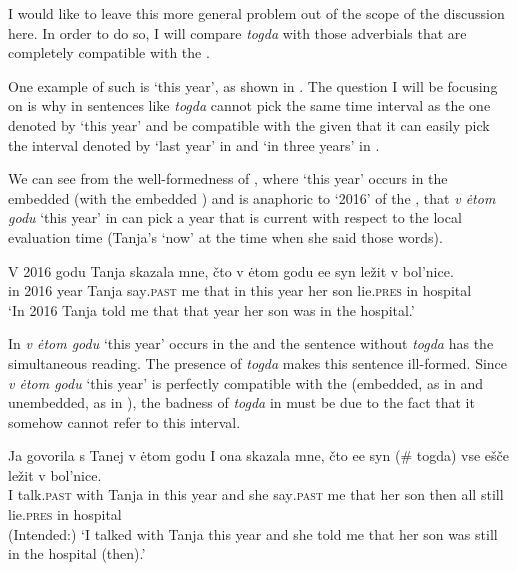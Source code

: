 \documentclass[output=paper,modfonts,newtxmath,hidelinks]{langscibook}
\begin{document}
\label{20:ex11}
\z

\noindent I would like to leave this more general problem out of the scope of the discussion here. In order to do so, I will compare \textit{togda} with those adverbials that are completely compatible with the .

One example of such  is ‘this year’, as shown in . The question I will be focusing on is why in sentences like  \textit{togda} cannot pick the same time interval as the one denoted by ‘this year’ and be compatible with the  given that it can easily pick the interval denoted by ‘last year’ in  and ‘in three years’ in .

We can see from the well-formedness of , where ‘this year’ occurs in the embedded  (with the embedded ) and is anaphoric to ‘2016’ of the , that \textit{v ėtom godu} ‘this year’ in  can pick a year that is current with respect to the local evaluation time (Tanja’s ‘now’ at the time when she said those words).

\ea \label{20:ex12}
\gll V 2016 godu Tanja skazala mne, čto v ėtom godu ee syn ležit v bol’nice.\\
     in 2016 year Tanja say\textsc{.past} me that in this year her son lie\textsc{.pres} in hospital\\
\glt `In 2016 Tanja told me that that year her son was in the hospital.'
\z

\noindent In  \textit{v ėtom godu} ‘this year’ occurs in the  and the sentence without \textit{togda} has the simultaneous reading. The presence of \textit{togda} makes this sentence ill-formed. Since \textit{v ėtom godu} ‘this year’ is perfectly compatible with the  (embedded, as in  and unembedded, as in ), the badness of \textit{togda} in  must be due to the fact that it somehow cannot refer to this interval.

\ea \label{20:ex13}
\gll Ja govorila s Tanej v ėtom godu I ona skazala mne, čto ee syn (\#\hspace{-2pt} togda) vse ešče ležit v bol’nice.\\
     I talk\textsc{.past} with Tanja in this year and she say\textsc{.past} me that her son {} then all still lie\textsc{.pres} in hospital\\
\glt (Intended:) `I talked with Tanja this year and she told me that her son was still in the hospital (then).'
\z
\end{document}
